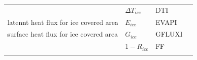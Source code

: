 \begin{longtable}[]{@{}llll@{}}
\begin{minipage}[t]{0.39\columnwidth}
\end{minipage} & \begin{minipage}[t]{0.33\columnwidth}\raggedright
\(\Delta T_{ice}\)\strut
\end{minipage} & \begin{minipage}[t]{0.08\columnwidth}\raggedright
DTI\strut
\end{minipage} & \begin{minipage}[t]{0.09\columnwidth}\raggedright
\strut
\end{minipage}\tabularnewline
\begin{minipage}[t]{0.39\columnwidth}\raggedright
latennt heat flux for ice covered area\strut
\end{minipage} & \begin{minipage}[t]{0.33\columnwidth}\raggedright
\(E_{ice}\)\strut
\end{minipage} & \begin{minipage}[t]{0.08\columnwidth}\raggedright
EVAPI\strut
\end{minipage} & \begin{minipage}[t]{0.09\columnwidth}\raggedright
\strut
\end{minipage}\tabularnewline
\begin{minipage}[t]{0.39\columnwidth}\raggedright
surface heat flux for ice covered area\strut
\end{minipage} & \begin{minipage}[t]{0.33\columnwidth}\raggedright
\(G_{ice}\)\strut
\end{minipage} & \begin{minipage}[t]{0.08\columnwidth}\raggedright
GFLUXI\strut
\end{minipage} & \begin{minipage}[t]{0.09\columnwidth}\raggedright
\strut
\end{minipage}\tabularnewline
\begin{minipage}[t]{0.39\columnwidth}\raggedright
\strut
\end{minipage} & \begin{minipage}[t]{0.33\columnwidth}\raggedright
\(1-R_{ice}\)\strut
\end{minipage} & \begin{minipage}[t]{0.08\columnwidth}\raggedright
FF\strut
\end{minipage} & \begin{minipage}[t]{0.09\columnwidth}\raggedright
\strut
\end{minipage}\tabularnewline
\begin{minipage}[t]{0.39\columnwidth}\raggedright

\end{minipage}
\end{longtable}
